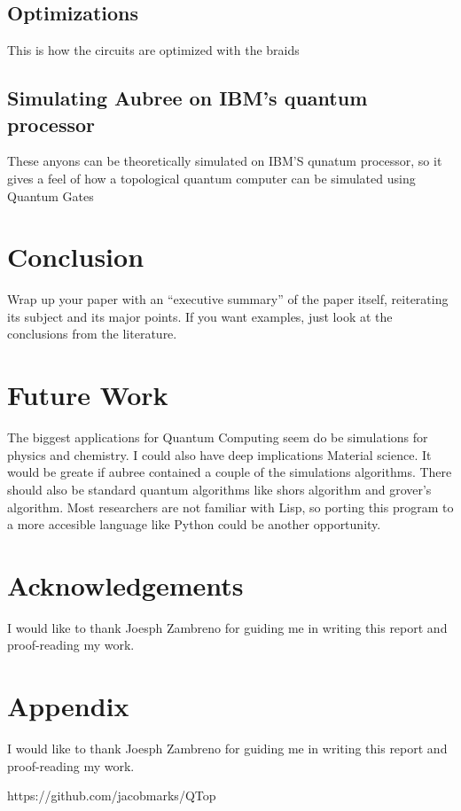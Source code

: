 \documentclass{article}
\begin{document}
\subsection{Optimizations}
This is how the circuits are optimized with the braids


\subsection{Simulating Aubree on IBM's quantum processor}
These anyons can be theoretically simulated on IBM'S qunatum processor, so it gives a feel of how a topological quantum computer can be simulated using Quantum Gates


\section{Conclusion}

Wrap up your paper with an ``executive summary'' of the paper itself, reiterating its subject and its major points.  If you want examples, just look at the conclusions from the literature.

\section{Future Work}
The biggest applications for Quantum Computing seem do be simulations for physics and chemistry. I could also have deep implications Material science. It would be greate if aubree contained a couple of the simulations algorithms. There should also be standard quantum algorithms like shors algorithm and grover's algorithm. Most researchers are not familiar with Lisp, so porting this program to a more accesible language like Python could be another opportunity.


\section{Acknowledgements}
I would like to thank Joesph Zambreno for guiding me in writing this report and proof-reading my work.

\section{Appendix}
I would like to thank Joesph Zambreno for guiding me in writing this report and proof-reading my work.






https://github.com/jacobmarks/QTop
\end{document}
